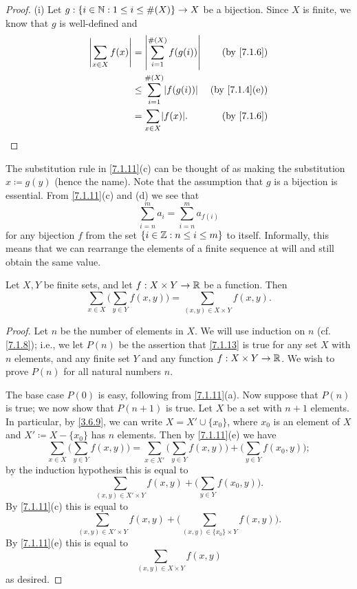 \begin{proof}{(i)}
  Let \(g : \{i \in \mathbb{N} : 1 \leq i \leq \#(X)\} \to X\) be a bijection.
  Since \(X\) is finite, we know that \(g\) is well-defined and
  \begin{align*}
    \abs{\sum_{x \in X} f(x)} & = \abs{\sum_{i = 1}^{\#(X)} f(g(i))}    & \text{(by \cref{7.1.6})}    \\
                              & \leq \sum_{i = 1}^{\#(X)} \abs{f(g(i))} & \text{(by \cref{7.1.4}(e))} \\
                              & = \sum_{x \in X} \abs{f(x)}.            & \text{(by \cref{7.1.6})}
  \end{align*}
\end{proof}

\begin{rmk}\label{7.1.12}
  The substitution rule in \cref{7.1.11}(c) can be thought of as making the substitution \(x \coloneqq g(y)\) (hence the name).
  Note that the assumption that \(g\) is a bijection is essential.
  From \cref{7.1.11}(c) and (d) we see that
  \[
    \sum_{i = n}^m a_i = \sum_{i = n}^m a_{f(i)}
  \]
  for any bijection \(f\) from the set \(\{i \in \mathbb{Z} : n \leq i \leq m\}\) to itself.
  Informally, this means that we can rearrange the elements of a finite sequence at will and still obtain the same value.
\end{rmk}

\begin{lem}\label{7.1.13}
  Let \(X, Y\) be finite sets, and let \(f : X \times Y \to \mathbb{R}\) be a function.
  Then
  \[
    \sum_{x \in X} \bigg(\sum_{y \in Y} f(x, y)\bigg) = \sum_{(x, y) \in X \times Y} f(x, y).
  \]
\end{lem}

\begin{proof}
  Let \(n\) be the number of elements in \(X\).
  We will use induction on \(n\) (cf. \cref{7.1.8});
  i.e., we let \(P(n)\) be the assertion that \cref{7.1.13} is true for any set \(X\) with \(n\) elements, and any finite set \(Y\) and any function \(f : X \times Y \to \mathbb{R}\).
  We wish to prove \(P(n)\) for all natural numbers \(n\).

  The base case \(P(0)\) is easy, following from \cref{7.1.11}(a).
  Now suppose that \(P(n)\) is true;
  we now show that \(P(n + 1)\) is true.
  Let \(X\) be a set with \(n + 1\) elements.
  In particular, by \cref{3.6.9}, we can write \(X = X' \cup \{x_0\}\), where \(x_0\) is an element of \(X\) and \(X' \coloneqq X - \{x_0\}\) has \(n\) elements.
  Then by \cref{7.1.11}(e) we have
  \[
    \sum_{x \in X} \bigg(\sum_{y \in Y} f(x, y)\bigg) = \sum_{x \in X'} \bigg(\sum_{y \in Y} f(x, y)\bigg) + \bigg(\sum_{y \in Y} f(x_0, y)\bigg);
  \]
  by the induction hypothesis this is equal to
  \[
    \sum_{(x, y) \in X' \times Y} f(x, y) + \bigg(\sum_{y \in Y} f(x_0, y)\bigg).
  \]
  By \cref{7.1.11}(c) this is equal to
  \[
    \sum_{(x, y) \in X' \times Y} f(x, y) + \bigg(\sum_{(x, y) \in \{x_0\} \times Y} f(x, y)\bigg).
  \]
  By \cref{7.1.11}(e) this is equal to
  \[
    \sum_{(x, y) \in X \times Y} f(x, y)
  \]
  as desired.
\end{proof}

